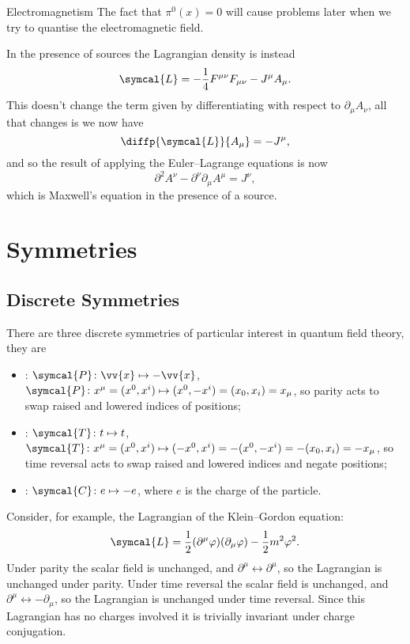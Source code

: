 \documentclass[fleqn]{NotesClass}
\newcommand{\dalembertian}{\partial^2}
\newcommand{\lagrangianDensity}{\symcal{L}}
\newcommand{\parity}{\symcal{P}}
\newcommand{\chargeConjugation}{\symcal{C}}
\newcommand{\timeReversal}{\symcal{T}}
\begin{document}
\begin{exm}{Electromagnetism}{}
        The fact that \(\pi^0(x) = 0\) will cause problems later when we try to quantise the electromagnetic field.
        
        In the presence of sources the Lagrangian density is instead
        \begin{equation}
            \lagrangianDensity = -\frac{1}{4}F^{\mu\nu}F_{\mu\nu} - J^\mu A_\mu.
        \end{equation}
        This doesn't change the term given by differentiating with respect to \(\partial_\mu A_\nu\), all that changes is we now have
        \begin{equation}
            \diffp{\lagrangianDensity}{A_\mu} = -J^\mu,
        \end{equation}
        and so the result of applying the Euler--Lagrange equations is now
        \begin{equation}
            \dalembertian A^\nu - \partial^\nu \partial_\mu A^\mu = J^\nu,
        \end{equation}
        which is Maxwell's equation in the presence of a source.
    \end{exm}
    
    \section{Symmetries}
    \subsection{Discrete Symmetries}
    There are three discrete symmetries of particular interest in quantum field theory, they are
    \begin{itemize}
        \item {}: \(\parity \colon \vv{x} \mapsto -\vv{x}\), \(\parity \colon x^\mu = (x^0, x^i) \mapsto (x^0, -x^i) = (x_0, x_i) = x_\mu\), so parity acts to swap raised and lowered indices of positions;
        \item {}: \(\timeReversal \colon t \mapsto t\), \(\timeReversal \colon x^\mu = (x^0, x^i) \mapsto (-x^0, x^i) = -(x^0, -x^i) = -(x_0, x_i) = -x_\mu\), so time reversal acts to swap raised and lowered indices and negate positions;
        \item {}: \(\chargeConjugation \colon e \mapsto -e\), where \(e\) is the charge of the particle.
    \end{itemize}
    
    Consider, for example, the Lagrangian of the Klein--Gordon equation:
    \begin{equation}
        \lagrangianDensity = \frac{1}{2}(\partial^\mu \varphi)(\partial_\mu\varphi) - \frac{1}{2}m^2 \varphi^2.
    \end{equation}
    Under parity the scalar field is unchanged, and \(\partial^\mu \leftrightarrow \partial^\mu\), so the Lagrangian is unchanged under parity.
    Under time reversal the scalar field is unchanged, and \(\partial^\mu \leftrightarrow -\partial_\mu\), so the Lagrangian is unchanged under time reversal.
    Since this Lagrangian has no charges involved it is trivially invariant under charge conjugation.
    
\end{document}
